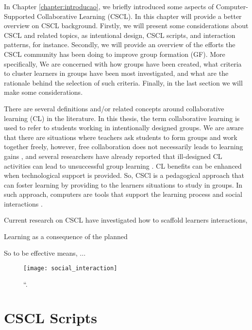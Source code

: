 \label{cha:background-cscl}
In Chapter \ref{chapter:introducao}, we briefly introduced some aspects of Computer-Supported Collaborative Learning (CSCL). 
In this chapter will provide a better overview on CSCL background. 
Firstly, we will present some considerations about CSCL and related topics, as intentional design, CSCL scripts, and interaction patterns, for instance. 
Secondly, we will provide an overview of the efforts the CSCL community has been doing to improve group formation (GF). 
More specifically, We are concerned with how groups have been created, what criteria to cluster learners in groups have been most investigated, and what are the rationale behind the selection of such criteria. 
Finally, in the last section we will make some considerations.

There are several definitions and/or related concepts around collaborative learning (CL) in the literature. 
In this thesis, the term collaborative learning is used to refer to students working in intentionally designed groups. 
We are aware that there are situations where teachers ask students to form groups and work together freely, however, free collaboration does not necessarily leads to learning gains \cite{An_Ontological_Engineering_Approach_tese}, and several researchers have already reported that ill-designed CL activities can lead to unsuccessful group learning \cite{Motivation_in_a_computer-supported_collaborative_learning}. 
CL benefits can be enhanced when technological support is provided. 
So, CSCl is a pedagogical approach that can foster learning by providing to the learners situations to study in groups. 
In such approach, computers are tools that support the learning process and social interactions \cite{CSCL_historical_perspective}. 

Current research on CSCL have investigated how to scaffold learners interactions, 

Learning as a consequence of the planned 

So to be effective means, ...


\begin{figure}[h!]
\caption{“.}
\centering
\texttt{[image: social\_interaction]}
\label{fig:social_interaction}
\end{figure}

\section{CSCL Scripts}

